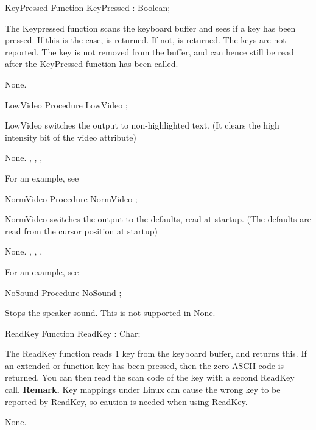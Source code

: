 \latex{}
 \html{}
\begin{function}{KeyPressed}
\Declaration
Function KeyPressed  : Boolean;

\Description
 The Keypressed function scans the keyboard buffer and sees if a key has
been pressed. If this is the case,  is returned. If not,
 is returned. The  keys are not reported.
The key is not removed from the buffer, and can hence still be read after
the KeyPressed function has been called.

\Errors
None.
\SeeAlso
{}
\end{function}
\latex{}
 \html{}
\begin{procedure}{LowVideo}
\Declaration
Procedure LowVideo ;

\Description
 LowVideo switches the output to non-highlighted text. (It clears the high
intensity bit of the video attribute)

\Errors
None.
\SeeAlso
 , , ,
\end{procedure}
For an example, see 
\begin{procedure}{NormVideo}
\Declaration
Procedure NormVideo ;

\Description
 NormVideo switches the output to the defaults, read at startup. (The
defaults are read from the cursor position at startup)

\Errors
None.
\SeeAlso
 , , ,
\end{procedure}
For an example, see 
\begin{procedure}{NoSound}
\Declaration
Procedure NoSound ;

\Description

Stops the speaker sound.
This is not supported in \linux
\Errors
None.
\SeeAlso
{}
\end{procedure}
\latex{}
 \html{}
\begin{function}{ReadKey}
\Declaration
Function ReadKey  : Char;

\Description

The ReadKey function reads 1 key from the keyboard buffer, and returns this.
If an extended or function key has been pressed, then the zero ASCII code is 
returned. You can then read the scan code of the key with a second ReadKey
call.
\textbf{Remark.} Key mappings under Linux can cause the wrong key to be
reported by ReadKey, so caution is needed when using ReadKey.  

\Errors
None.
\SeeAlso
{}
\end{function}
